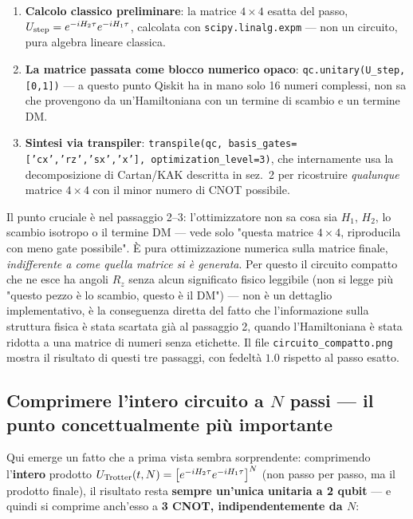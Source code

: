 \documentclass[11pt,a4paper]{article}
\begin{document}
\begin{enumerate}[leftmargin=1.4em,itemsep=0.25em]
\item \textbf{Calcolo classico preliminare}: la matrice $4\times4$
esatta del passo, $U_{\rm step}=e^{-iH_2\tau}e^{-iH_1\tau}$, calcolata
con \texttt{scipy.linalg.expm} --- non un circuito, pura algebra
lineare classica.
\item \textbf{La matrice passata come blocco numerico opaco}:
\texttt{qc.unitary(U\_step, [0,1])} --- a questo punto Qiskit ha in
mano solo 16 numeri complessi, non sa che provengono da
un'Hamiltoniana con un termine di scambio e un termine DM.
\item \textbf{Sintesi via transpiler}:
\texttt{transpile(qc, basis\_gates=['cx','rz','sx','x'],
optimization\_level=3)}, che internamente usa la decomposizione di
Cartan/KAK descritta in sez.~2 per ricostruire \emph{qualunque} matrice
$4\times4$ con il minor numero di CNOT possibile.
\end{enumerate}

\begin{editnote}
Il punto cruciale è nel passaggio 2--3: l'ottimizzatore non sa cosa sia
$H_1$, $H_2$, lo scambio isotropo o il termine DM --- vede solo "questa
matrice $4\times4$, riproducila con meno gate possibile". È pura
ottimizzazione numerica sulla matrice finale, \emph{indifferente a come
quella matrice si è generata}. Per questo il circuito compatto che ne
esce ha angoli $R_z$ senza alcun significato fisico leggibile (non si
legge più "questo pezzo è lo scambio, questo è il DM") --- non è un
dettaglio implementativo, è la conseguenza diretta del fatto che
l'informazione sulla struttura fisica è stata scartata già al
passaggio 2, quando l'Hamiltoniana è stata ridotta a una matrice di
numeri senza etichette. Il file \texttt{circuito\_compatto.png} mostra
il risultato di questi tre passaggi, con fedeltà $1.0$ rispetto al
passo esatto.
\end{editnote}

\subsection*{Comprimere l'intero circuito a $N$ passi --- il punto concettualmente più importante}

Qui emerge un fatto che a prima vista sembra sorprendente: comprimendo
l'\textbf{intero} prodotto
$U_{\rm Trotter}(t,N)=\big[e^{-iH_2\tau}e^{-iH_1\tau}\big]^N$ (non passo
per passo, ma il prodotto finale), il risultato resta \textbf{sempre
un'unica unitaria a 2 qubit} --- e quindi si comprime anch'esso a
\textbf{3 CNOT, indipendentemente da $N$}:
\end{document}

